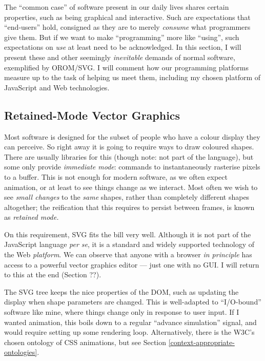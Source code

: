 The ``common case'' of software present in our daily lives shares
certain properties, such as being graphical and interactive. Such are
expectations that ``end-users'' hold, consigned as they are to merely
\emph{consume} what programmers give them. But if we want to make
``programming'' more like ``using'', such expectations on \emph{use} at
least need to be acknowledged. In this section, I will present these and
other seemingly \emph{inevitable} demands of normal software,
exemplified by OROM/SVG. I will comment how our programming platforms
measure up to the task of helping us meet them, including my chosen
platform of JavaScript and Web technologies.

\hypertarget{retained-mode-vector-graphics}{%
\subsection{Retained-Mode Vector
Graphics}\label{retained-mode-vector-graphics}}

Most software is designed for the subset of people who have a colour
display they can perceive. So right away it is going to require ways to
draw coloured shapes. There are usually libraries for this (though note:
not part of the language), but some only provide \emph{immediate mode}:
commands to instantaneously rasterise pixels to a buffer. This is not
enough for modern software, as we often expect animation, or at least to
see things change as we interact. Most often we wish to see \emph{small
changes} to the \emph{same} shapes, rather than completely different
shapes altogether; the reification that this requires to persist between
frames, is known as \emph{retained mode.}

On this requirement, SVG fits the bill very well. Although it is not
part of the JavaScript language \emph{per se}, it is a standard and
widely supported technology of the Web \emph{platform}. We can observe
that anyone with a browser \emph{in principle} has access to a powerful
vector graphics editor --- just one with no GUI. I will return to this
at the end (Section ??).

The SVG tree keeps the nice properties of the DOM, such as updating the
display when shape parameters are changed. This is well-adapted to
``I/O-bound'' software like mine, where things change only in response
to user input. If I wanted animation, this boils down to a regular
``advance simulation'' signal, and would require setting up some
rendering loop. Alternatively, there is the W3C's chosen ontology of CSS
animations, but see Section \ref{context-appropriate-ontologies}.

